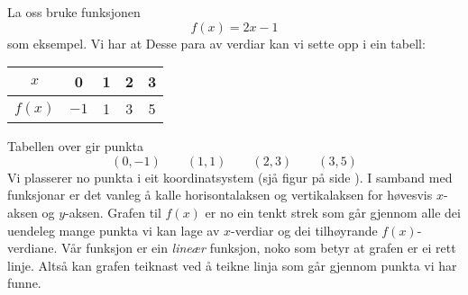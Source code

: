 La oss bruke funksjonen 
\[ f(x)=2x-1 \]
som eksempel. Vi har at
Desse para av verdiar kan vi sette opp i ein tabell:
	\begin{center}
	\begin{tabular}{c | c |c |c|c}
		$ x $ & 0 & 1 & 2 & 3 \\ \hline
		$ f(x) $ &$  -1 $ & 1&3 &5
	\end{tabular}
\end{center}
Tabellen over gir punkta
\[ (0, -1)\quad\quad(1, 1)\quad\quad(2, 3)\quad\quad(3, 5) \]
Vi plasserer no punkta i eit koordinatsystem (sjå figur på side \pageref{funkfig}). I samband med funksjonar er det vanleg å kalle horisontalaksen og vertikalaksen for høvesvis $ x $-aksen og $ y $-aksen. 
Grafen til $ f(x) $ er no ein tenkt strek som går gjennom alle dei uendeleg mange punkta vi kan lage av $ x$-verdiar og dei tilhøyrande $ f(x) $-verdiane. Vår funksjon er ein \textit{lineær} funksjon, noko som betyr at grafen er ei rett linje. Altså kan grafen teiknast ved å teikne linja som går gjennom punkta vi har funne.\vsk

